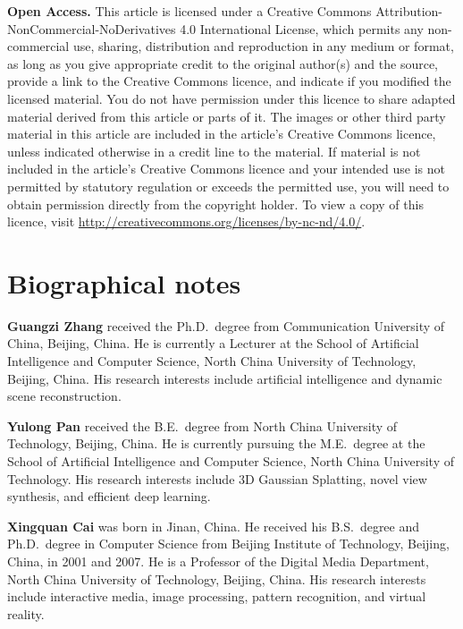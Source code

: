 \documentclass[pdflatex,sn-mathphys]{sn-jnl}
\begin{document}
\noindent\textbf{Open Access.} This article is licensed under a Creative Commons Attribution-NonCommercial-NoDerivatives 4.0 International License, which permits any non-commercial use, sharing, distribution and reproduction in any medium or format, as long as you give appropriate credit to the original author(s) and the source, provide a link to the Creative Commons licence, and indicate if you modified the licensed material. You do not have permission under this licence to share adapted material derived from this article or parts of it. The images or other third party material in this article are included in the article's Creative Commons licence, unless indicated otherwise in a credit line to the material. If material is not included in the article's Creative Commons licence and your intended use is not permitted by statutory regulation or exceeds the permitted use, you will need to obtain permission directly from the copyright holder. To view a copy of this licence, visit \url{http://creativecommons.org/licenses/by-nc-nd/4.0/}.


\section*{Biographical notes}


\noindent\textbf{Guangzi Zhang} received the Ph.D.~degree from Communication University of China, Beijing, China. He is currently a Lecturer at the School of Artificial Intelligence and Computer Science, North China University of Technology, Beijing, China. His research interests include artificial intelligence and dynamic scene reconstruction.

\vspace{8pt}

\noindent\textbf{Yulong Pan} received the B.E.~degree from North China University of Technology, Beijing, China. He is currently pursuing the M.E.~degree at the School of Artificial Intelligence and Computer Science, North China University of Technology. His research interests include 3D Gaussian Splatting, novel view synthesis, and efficient deep learning.

\vspace{8pt}

\noindent\textbf{Xingquan Cai} was born in Jinan, China. He received his B.S.~degree and Ph.D.~degree in Computer Science from Beijing Institute of Technology, Beijing, China, in 2001 and 2007. He is a Professor of the Digital Media Department, North China University of Technology, Beijing, China. His research interests include interactive media, image processing, pattern recognition, and virtual reality.



\end{document}
